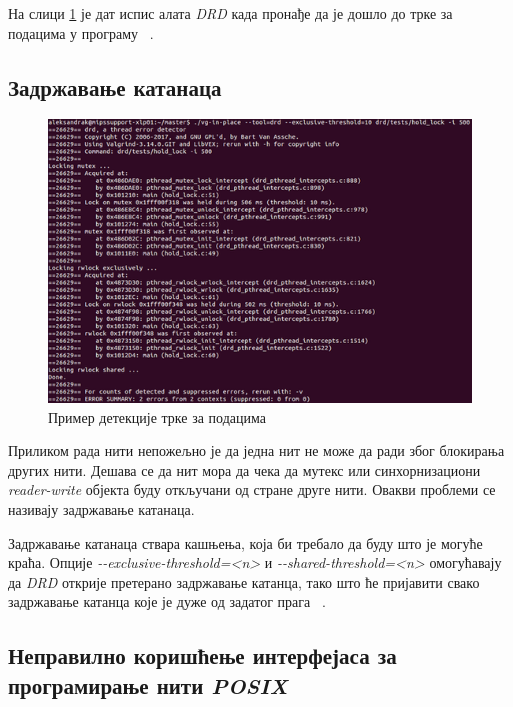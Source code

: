 \documentclass[12pt,oneside]{memoir}
\begin{document}
\indent На слици \ref{fig:drd-data-race} је дат испис алата \textit{DRD} када пронађе да је дошло до трке за подацима у програму ~\cite{drdRef}.

\subsection{Задржавање катанаца}

\begin{figure}[h!]
\begin{center}
\includegraphics[scale=0.75]{slika21.png}
\end{center}
\caption{ Пример детекције трке за подацима}
\label{fig:drd-data-race}
\end{figure}

\indent Приликом рада нити непожељно је да једна нит не може да ради због блокирања других нити. Дешава се да нит мора да чека да мутекс или синхорнизациони \textit{reader-write} објекта буду откључани од стране друге нити. Овакви проблеми се називају задржавање катанаца.

\indent Задржавање катанаца ствара кашњења, која би требало да буду што је могуће краћа. Опције \textit{-\--exclusive-threshold=<n>} и \textit{-\--shared-threshold=<n>} омогућавају да \textit{DRD} открије претерано задржавање катанца, тако што ће пријавити свако задржавање катанца које је дуже од задатог прага ~\cite{drdRef}.

\subsection{Неправилно коришћење интерфејаса за програмирање нити \textit{POSIX}}
\end{document}
